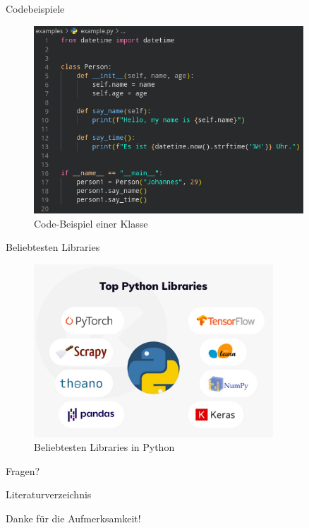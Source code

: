 \documentclass[10pt,ngerman]{beamer}
\begin{document}
\begin{frame}[fragile]{Codebeispiele}
  \begin{figure}
    \centering
    \includegraphics[width=0.9\textwidth]{pictures/class_example.png}
    \caption[Code-Beispiel einer Klasse]{Code-Beispiel einer Klasse}
  \end{figure}
\end{frame}

\begin{frame}[fragile]{Beliebtesten Libraries}
  \begin{figure}
    \centering
    \includegraphics[width=0.8\textwidth]{pictures/libraries.jpg}
    \caption[Beliebtesten Libraries in Python]{Beliebtesten Libraries in Python}
  \end{figure}
\end{frame}

\begin{frame}[standout]
  Fragen?
\end{frame}

\appendix

\begin{frame}[allowframebreaks]{Literaturverzeichnis}

  \printbibliography[title={Literaturverzeichnis}]

\end{frame}

\begin{frame}[standout]
  Danke für die Aufmerksamkeit!
\end{frame}
\end{document}

